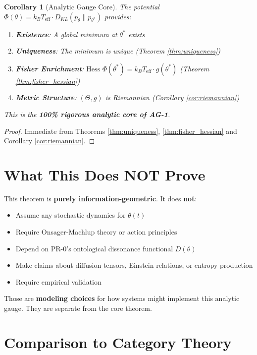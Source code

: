 \documentclass[11pt]{article}
\newtheorem{corollary}[theorem]{Corollary}
\begin{document}
\begin{corollary}[Analytic Gauge Core]
\label{cor:ag1_core}
The potential $\Phi(\theta) = k_B T_{\text{eff}} \cdot D_{KL}(p_\theta \| p_{\theta^*})$ provides:

\begin{enumerate}
\item \textbf{Existence}: A global minimum at $\theta^*$ exists
\item \textbf{Uniqueness}: The minimum is unique (Theorem \ref{thm:uniqueness})
\item \textbf{Fisher Enrichment}: $\text{Hess } \Phi(\theta^*) = k_B T_{\text{eff}} \cdot g(\theta^*)$ (Theorem \ref{thm:fisher_hessian})
\item \textbf{Metric Structure}: $(\Theta, g)$ is Riemannian (Corollary \ref{cor:riemannian})
\end{enumerate}

This is the \textbf{100\% rigorous analytic core of AG-1}.
\end{corollary}

\begin{proof}
Immediate from Theorems \ref{thm:uniqueness}, \ref{thm:fisher_hessian} and Corollary \ref{cor:riemannian}.
\end{proof}

\section{What This Does NOT Prove}

This theorem is \textbf{purely information-geometric}. It does \textbf{not}:

\begin{itemize}
\item Assume any stochastic dynamics for $\theta(t)$
\item Require Onsager-Machlup theory or action principles
\item Depend on PR-0's ontological dissonance functional $D(\theta)$
\item Make claims about diffusion tensors, Einstein relations, or entropy production
\item Require empirical validation
\end{itemize}

Those are \textbf{modeling choices} for how systems might implement this analytic gauge. They are separate from the core theorem.

\section{Comparison to Category Theory}
\end{document}
